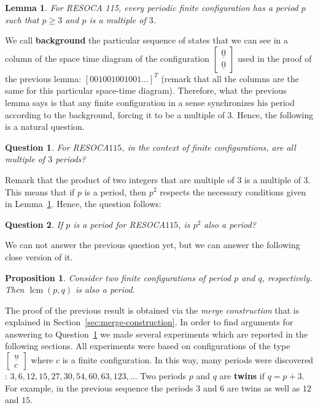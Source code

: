 \documentclass[submission,copyright,creativecommons]{eptcs}
\DeclareMathOperator{\lcm}{lcm}
\newcommand{\cvres}[2]{\ensuremath{\begin{bmatrix}#1\\#2\end{bmatrix}}\xspace}
\newcommand{\cz}{\ensuremath{\underline{0}}\xspace}
\newcommand{\cu}{\ensuremath{\underline{u}}\xspace}
\newcommand{\RESOCA}{RESOCA\xspace}
\newtheorem{question}{Question}
\newtheorem{proposition}{Proposition}
\newtheorem{lemma}{Lemma}
\begin{document}
\begin{lemma}
\label{lem:nec-cond-period}
For RESOCA 115,
every periodic finite configuration has a period $p$ such that $p\geq 3$ and $p$ is a multiple of $3$.
\end{lemma}

We call \textbf{background} the particular sequence of states that we can see in a column of the space time diagram of the configuration \cvres{\cz}{\cz} used in the proof of the previous lemma: $[001001001001\dots]^T$ (remark that all the columns are the same for this particular space-time diagram).
Therefore, what the previous lemma
says is that any finite configuration
in a sense synchronizes his period
according to the background, forcing
it to be a multiple of $3$. Hence,
the following is a natural question.

\begin{question}
\label{question:are-all-n-congruent-to-0-periods}
For \RESOCA $115$, in the context of finite configurations, are all multiple of $3$ periods?
\end{question}
Remark that the product of two integers that are multiple of $3$ is a multiple of $3$. This means that if $p$ is a period, then $p^2$ respects the necessary conditions given in Lemma~\ref{lem:nec-cond-period}. Hence, the question follows:
\begin{question}
If $p$ is a period for \RESOCA $115$, is $p^2$ also a period?
\end{question}
We can not answer the previous question yet, but we can answer the following close version of it. 
\begin{proposition}
    \label{mergeperiod}
    Consider two finite configurations of
    period $p$ and $q$, respectively.
    Then $\lcm(p,q)$ is also a period. 
    \end{proposition}
The proof of the previous result is obtained via the
\emph{merge construction} that
is explained in Section~\ref{sec:merge-construction}.
In order to find arguments for answering to Question~\ref{question:are-all-n-congruent-to-0-periods} we made several experiments which are reported in the following sections. All experiments were based on configurations of the type \cvres{\cu}{c} where $c$ is a finite configuration.
In this way, many periods were discovered %
: $3, 6, 12, 15, 27, 30, 54, 60, 63, 123, \ldots$ Two periods $p$ and $q$ are \textbf{twins} if $q=p+3$. For example, in the previous sequence the periods $3$ and $6$ are twins as well as $12$ and $15$.
\end{document}
